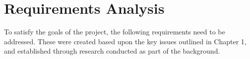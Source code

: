 \chapter{Requirements Analysis}\label{C:requirements}

To satisfy the goals of the project, the following requirements need to be addressed. These were created based upon the key issues outlined in Chapter 1, and established through research conducted as part of the background. 








